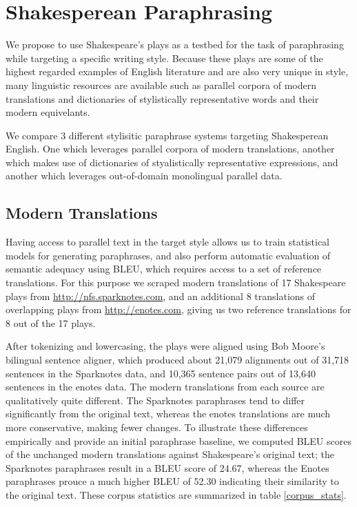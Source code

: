\documentclass[10pt,a5paper,twoside]{article}
\begin{document}
\section{Shakesperean Paraphrasing}
We propose to use Shakespeare's plays as a testbed for the task of paraphrasing while targeting a specific writing style.  Because these plays are some of the
highest regarded examples of English literature and are also very unique in style, many linguistic resources are available such as parallel corpora
of modern translations and dictionaries of stylistically representative words and their modern equivelants.

We compare 3 different stylisitic paraphrase systems targeting Shakesperean English.  One which leverages parallel corpora of modern translations, another which makes use
of dictionaries of styalistically representative expressions, and another which leverages out-of-domain monolingual parallel data.

\subsection{Modern Translations}
Having access to parallel text in the target style allows us to train statistical models for generating paraphrases, and also perform automatic evaluation of semantic adequacy using BLEU, which requires access to a set of reference translations.  For this purpose we scraped modern translations of 17 Shakespeare plays from \url{http://nfs.sparknotes.com}, and an additional 8 translations of overlapping plays from \url{http://enotes.com}, giving us two reference translations for 8 out of the 17 plays.

After tokenizing and lowercasing, the plays were aligned using Bob Moore's bilingual sentence \cite{Moore02} aligner, which produced about 21,079 alignments out of 31,718 sentences in the Sparknotes data, and 10,365 sentence pairs out of 13,640 sentences in the enotes data.  The modern translations from each source are qualitatively quite
different.  The Sparknotes paraphrases tend to differ significantly from the original text, whereas the enotes translations are much more conservative, making fewer changes.
To illustrate these differences empirically and provide an initial paraphrase baseline, we computed BLEU scores of the unchanged modern translations against Shakespeare's 
original text; the Sparknotes paraphrases result in a BLEU score of 24.67, whereas the Enotes paraphrases prouce a much higher BLEU of 52.30 indicating their similarity to the original text.
These corpus statistics are summarized in table \ref{corpus_stats}.
\end{document}
